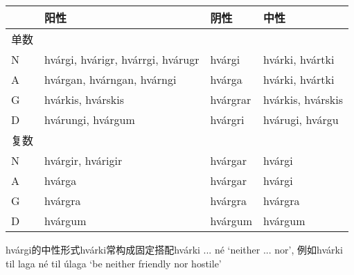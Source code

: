 \begin{longtable}{llll}
    \toprule
         & 阳性                              & 阴性     & 中性              \\
    \midrule
    \endhead
    \bottomrule
    \endfoot
    单数 &                                   &          &                   \\
    N    & hvárgi, hvárigr, hvárrgi, hvárugr & hvárgi   & hvárki, hvártki   \\
    A    & hvárgan, hvárngan, hvárngi        & hvárga   & hvárki, hvártki   \\
    G    & hvárkis, hvárskis                 & hvárgrar & hvárkis, hvárskis \\
    D    & hvárungi, hvárgum                 & hvárgri  & hvárugi, hvárgu   \\
    复数 &                                   &          &                   \\
    N    & hvárgir, hvárigir                 & hvárgar  & hvárgi            \\
    A    & hvárga                            & hvárgar  & hvárgi            \\
    G    & hvárgra                           & hvárgra  & hvárgra           \\
    D    & hvárgum                           & hvárgum  & hvárgum           \\
\end{longtable}

hvárgi的中性形式hvárki常构成固定搭配hvárki ... né `neither ... nor', 例如hvárki til laga né til úlaga `be neither friendly nor hostile'